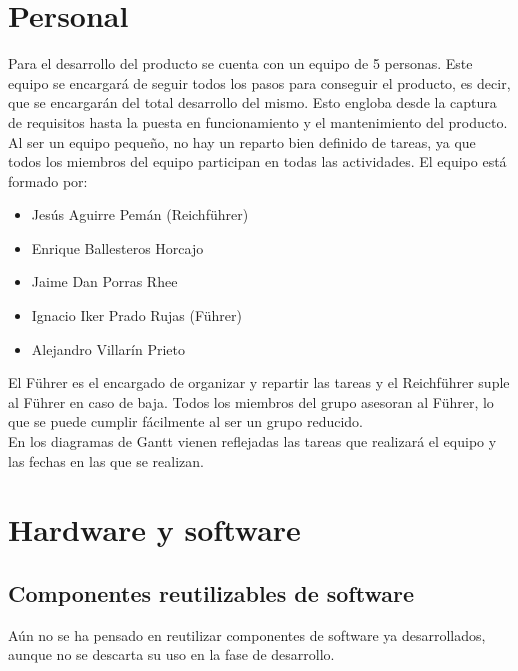 \documentclass[spanish,a4paper,12pt]{report}	%
\begin{document}
	\section{Personal}
		Para el desarrollo del producto se cuenta con un equipo de 5 personas. Este
		equipo se encargará de seguir todos los pasos para conseguir el producto, es
		decir, que se encargarán del total desarrollo del mismo. Esto engloba desde la
		captura de requisitos hasta la puesta en funcionamiento y el mantenimiento del
		producto.\\
		Al ser un equipo pequeño, no hay un reparto bien definido de tareas, ya que todos
		los miembros del equipo participan en todas las actividades. 
		El equipo está formado por: 
		\begin{itemize}
		  \item Jesús Aguirre Pemán (Reichführer)
		  \item Enrique Ballesteros Horcajo
		  \item Jaime Dan Porras Rhee
		  \item Ignacio Iker Prado Rujas (Führer)
		  \item Alejandro Villarín Prieto
		\end{itemize}
		El Führer es el encargado de organizar y repartir las tareas y el Reichführer suple al Führer en caso de baja.
		Todos los miembros del grupo asesoran al Führer, lo que se puede cumplir fácilmente al ser un grupo reducido.\\
		En los diagramas de Gantt vienen reflejadas las tareas que realizará el equipo y las fechas en las que se realizan.
		
	\section{Hardware y software}

		\subsection{Componentes reutilizables de software}
			Aún no se ha pensado en reutilizar componentes de software ya desarrollados, aunque no se descarta su uso
			en la fase de desarrollo.
\end{document}
